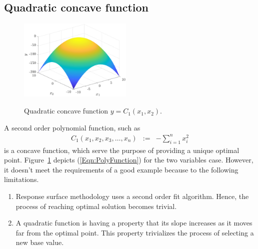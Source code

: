 \documentclass[twocolumn]{svjour3}          %
\begin{document}
\subsection{Quadratic concave function}
\begin{figure}
	\centering
	\includegraphics[width=0.48\textwidth]{images/poly-2-var}
	\label{Fig:TwoVariablePolynomial}
	\caption{Quadratic concave function $y=C_1(x_1, x_2)$.}
\end{figure}
A second order polynomial function, such as
\begin{eqnarray}
C_1(x_1, x_2, x_3, \dots, x_n) &:=& -\sum_{i=1}^{n}{x_i^2} \label{Eqn:PolyFunction}
\end{eqnarray}
is a concave function, which serve the purpose of providing a unique optimal point. Figure~\ref{Fig:TwoVariablePolynomial} depicts (\ref{Eqn:PolyFunction}) for the two variables case. However, it doesn't meet the requirements of a good example because to the following limitations.
\begin{enumerate}
	\item Response surface methodology uses a second order fit algorithm. Hence, the process of reaching optimal solution becomes trivial.
	\item A quadratic function is having a property that its slope increases as it moves far from the optimal point. This property trivializes the process of selecting a new base value.
\end{enumerate}
\end{document}

